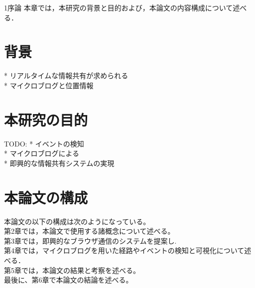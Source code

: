 \chapterhead
{1}{序論}
{本章では，本研究の背景と目的および，本論文の内容構成について述べる．}

\section{背景}

* リアルタイムな情報共有が求められる\\
* マイクロブログと位置情報\\


\newpage

\section{本研究の目的}
TODO:
* イベントの検知 \\
* マイクロブログによる \\
* 即興的な情報共有システムの実現

\newpage

\section{本論文の構成}
本論文の以下の構成は次のようになっている。\\
第2章では，本論文で使用する諸概念について述べる。\\
第3章では，即興的なブラウザ通信のシステムを提案し. \\
第4章では，マイクロブログを用いた経路やイベントの検知と可視化について述べる．\\
第5章では，本論文の結果と考察を述べる。\\
最後に、第6章で本論文の結論を述べる。\\
